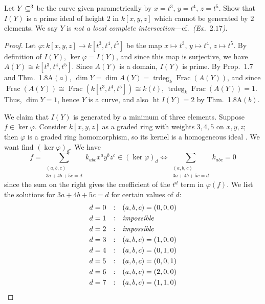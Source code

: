 \documentclass[10pt]{article}
\theoremstyle{definition}
\theoremstyle{remark}
\numberwithin{equation}{section}
\numberwithin{figure}{subsubsection}
\DeclareMathOperator{\Ht}{ht}
\let\AA\relax
\DeclareMathOperator{\AA}{\mathbf{A}}
\DeclareMathOperator{\Frac}{Frac}
\DeclareMathOperator{\trdeg}{trdeg}
\begin{document}
\begin{problem}
  Let $Y \subseteq \AA^3$ be the curve given parametrically by
  $x = t^3$, $y= t^4$, $z = t^5$.
  Show that $I(Y)$ is a prime ideal of height $2$ in $k[x,y,z]$ which cannot
  be generated by $2$ elements.
  We say $Y$ is \emph{not a local complete
  intersection}---cf.~\emph{(Ex.~$2.17$)}. 
\end{problem}
\begin{proof}
  Let $\varphi\colon k[x,y,z] \to k[t^3,t^4,t^5]$ be the map $x \mapsto t^3$, $y
  \mapsto t^4$, $z \mapsto t^5$.
  By definition of $I(Y)$, $\ker\varphi = I(Y)$, and since this map is
  surjective, we have $A(Y) \cong k[t^3,t^4,t^5]$.
  Since $A(Y)$ is a domain, $I(Y)$ is prime.
  By Prop.~1.7 and Thm.~1.8A$(a)$, $\dim Y = \dim A(Y) = \trdeg_k \Frac(A(Y))$,
  and since $\Frac(A(Y)) \cong \Frac(k[t^3,t^4,t^5]) \cong k(t)$,
  $\trdeg_k \Frac(A(Y)) = 1$.
  Thus, $\dim Y = 1$, hence $Y$ is a curve, and also $\Ht I(Y) = 2$ by
  Thm.~1.8A$(b)$.
  \par We claim that $I(Y)$ is generated by a minimum of three elements.
  Suppose $f \in \ker\varphi$.
  Consider $k[x,y,z]$ as a graded ring with weights $3,4,5$ on $x,y,z$; then
  $\varphi$ is a graded ring homomorphism, so its kernel is a homogeneous ideal
  \cite[Ch.~II, \S11.3, Prop.~3]{Bou74}.
  We want find $(\ker\varphi)_{d}$.
  We have
  \begin{equation*}
    f = \sum_{\substack{(a,b,c)\\3a+4b+5c=d}} k_{abc}x^ay^bz^c \in
    (\ker\varphi)_d \iff \sum_{\substack{(a,b,c)\\3a+4b+5c=d}} k_{abc} = 0
  \end{equation*}
  since the sum on the right gives the coefficient of the $t^d$ term in
  $\varphi(f)$.
  We list the solutions for $3a+4b+5c=d$ for certain values of $d$:
  {\allowdisplaybreaks\begin{alignat*}{10}
    d &= 0&:& \quad (a,b,c) = (0,0,0)\\
    d &= 1&:& \quad \text{\it impossible}\\
    d &= 2&:& \quad \text{\it impossible}\\
    d &= 3&:& \quad (a,b,c) = (1,0,0)\\
    d &= 4&:& \quad (a,b,c) = (0,1,0)\\
    d &= 5&:& \quad (a,b,c) = (0,0,1)\\
    d &= 6&:& \quad (a,b,c) = (2,0,0)\\
    d &= 7&:& \quad (a,b,c) = (1,1,0)\\

\end{alignat*}}
\end{proof}
\end{document}
